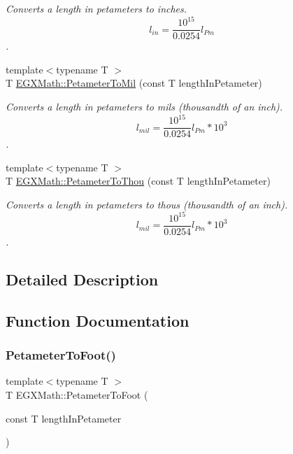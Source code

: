 \begin{DoxyCompactItemize}
\begin{DoxyCompactList}\small\item\em Converts a length in petameters to inches. \[ l_{in}= \frac{10^{15}}{0.0254} l_{Pm} \]. \end{DoxyCompactList}\item 
{\footnotesize template$<$typename T $>$ }\\T \mbox{\hyperlink{group___e_g_x_math-_conversions-_length_conversions-_petameter-_imperial_ga044a0e99c9e8335dc196daf1efb9c90f}{E\+G\+X\+Math\+::\+Petameter\+To\+Mil}} (const T length\+In\+Petameter)
\begin{DoxyCompactList}\small\item\em Converts a length in petameters to mils (thousandth of an inch). \[ l_{mil}= \frac{10^{15}}{0.0254} l_{Pm} * 10^{3} \]. \end{DoxyCompactList}\item 
{\footnotesize template$<$typename T $>$ }\\T \mbox{\hyperlink{group___e_g_x_math-_conversions-_length_conversions-_petameter-_imperial_gadcb69779fdf2696d6b9e13e2b23e6216}{E\+G\+X\+Math\+::\+Petameter\+To\+Thou}} (const T length\+In\+Petameter)
\begin{DoxyCompactList}\small\item\em Converts a length in petameters to thous (thousandth of an inch). \[ l_{mil}= \frac{10^{15}}{0.0254} l_{Pm} * 10^{3} \]. \end{DoxyCompactList}\end{DoxyCompactItemize}


\subsection{Detailed Description}


\subsection{Function Documentation}
\mbox{\label{group___e_g_x_math-_conversions-_length_conversions-_petameter-_imperial_gab1b79668a9de6a8374601bb44dde250d}} 
\subsubsection{\texorpdfstring{Petameter\+To\+Foot()}{PetameterToFoot()}}
{\footnotesize\ttfamily template$<$typename T $>$ \\
T E\+G\+X\+Math\+::\+Petameter\+To\+Foot (\begin{DoxyParamCaption}\item[{const T}]{length\+In\+Petameter }\end{DoxyParamCaption})}



